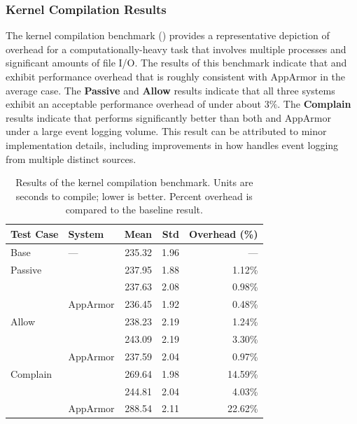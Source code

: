 \subsubsection{Kernel Compilation Results}

The kernel compilation benchmark () provides a representative
depiction of overhead for a computationally-heavy task that involves multiple processes
and significant amounts of file I/O. The results of this benchmark indicate that \bpfbox{}
and \bpfcontain{} exhibit performance overhead that is roughly consistent with AppArmor in
the average case. The \textbf{Passive} and \textbf{Allow} results indicate that all three
systems exhibit an acceptable performance overhead of under about $3\%$. The
\textbf{Complain} results indicate that \bpfcontain{} performs significantly better than
both \bpfbox{} and AppArmor under a large event logging volume. This result can be
attributed to minor implementation details, including improvements in how \bpfcontain{}
handles event logging from multiple distinct sources.

\begingroup\small
\begin{longtable}[c]{llrrr}
  \caption[Results of the kernel compilation benchmark]{
    Results of the kernel compilation benchmark. Units are seconds to compile; lower is
    better. Percent overhead is compared to the baseline result.
  }%
  \label{tab:phoronix-kernel}\\
  \toprule
   Test Case & System         &  Mean  & Std  & Overhead (\%)\\
   \midrule
   Base      & ---            & 235.32 & 1.96 & ---     \\
   \midrule
   Passive   & \bpfbox{}      & 237.95 & 1.88 &  1.12\% \\
             & \bpfcontain{}  & 237.63 & 2.08 &  0.98\% \\
             & AppArmor       & 236.45 & 1.92 &  0.48\% \\
   \midrule
   Allow     & \bpfbox{}      & 238.23 & 2.19 &  1.24\% \\
             & \bpfcontain{}  & 243.09 & 2.19 &  3.30\% \\
             & AppArmor       & 237.59 & 2.04 &  0.97\% \\
   \midrule
   Complain  & \bpfbox{}      & 269.64 & 1.98 & 14.59\% \\
             & \bpfcontain{}  & 244.81 & 2.04 &  4.03\% \\
             & AppArmor       & 288.54 & 2.11 & 22.62\% \\
  \bottomrule
\end{longtable}
\endgroup

